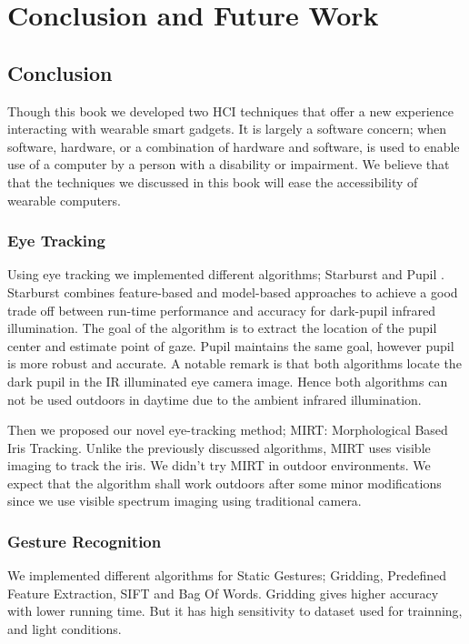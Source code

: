 \chapter{Conclusion and Future Work} 

\section{Conclusion} 
Though this book we developed two HCI techniques that offer a new experience interacting with wearable smart gadgets.  It is largely a software concern; when software, hardware, or a combination of hardware and software, is used to enable use of a computer by a person with a disability or impairment. We believe that that the techniques we discussed in this book will ease the accessibility of wearable computers.

\subsection{Eye Tracking} 
Using eye tracking we implemented different algorithms; Starburst \cite{starburst} and Pupil \cite{pupil}. Starburst combines feature-based and model-based approaches to achieve a good trade off between run-time performance and accuracy for dark-pupil infrared illumination. The goal of the algorithm is to extract the location of the pupil center and estimate point of gaze. Pupil maintains the same goal, however pupil is more robust and accurate. A notable remark is that both algorithms locate the dark pupil in the IR illuminated eye camera image. Hence both algorithms can not be used outdoors in daytime due to the ambient infrared illumination. \bigskip

Then we proposed our novel eye-tracking method; MIRT: Morphological Based Iris Tracking. Unlike the previously discussed algorithms, MIRT uses visible imaging to track the iris. We didn't try MIRT in outdoor environments. We expect that the algorithm shall work outdoors after some minor modifications since we use visible spectrum imaging using traditional camera.


\subsection{Gesture Recognition} 
We implemented different algorithms for Static Gestures; Gridding, Predefined Feature Extraction, SIFT and Bag Of Words.
Gridding gives higher accuracy with lower running time. But it has high sensitivity to dataset used for trainning, and light conditions.
\bigskip

